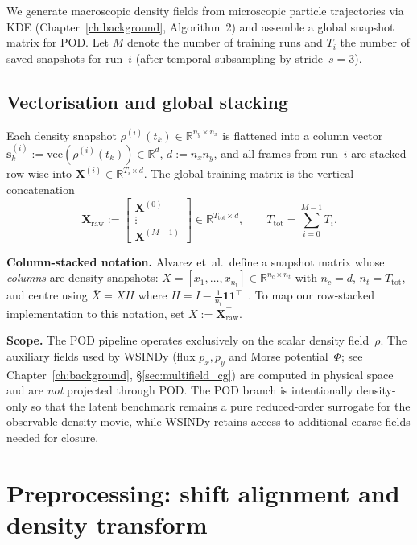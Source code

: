 We generate macroscopic density fields from microscopic particle trajectories
via KDE (Chapter~\ref{ch:background}, Algorithm~2) and assemble a global
snapshot matrix for POD.  Let $M$ denote the number of training runs and
$T_i$ the number of saved snapshots for run~$i$ (after temporal subsampling
by stride~$s=3$).

\subsection{Vectorisation and global stacking}
\label{subsec:vectorization}

Each density snapshot $\rho^{(i)}(t_k)\in\mathbb{R}^{n_y\times n_x}$ is
flattened into a column vector
$\mathbf{s}^{(i)}_k := \mathrm{vec}(\rho^{(i)}(t_k))\in\mathbb{R}^{d}$,
$d:=n_x n_y$, and all frames from run~$i$ are stacked row-wise into
$\mathbf{X}^{(i)}\in\mathbb{R}^{T_i\times d}$.  The global training matrix
is the vertical concatenation
\[
  \mathbf{X}_{\mathrm{raw}}
  :=\begin{bmatrix}
      \mathbf{X}^{(0)}\\\vdots\\\mathbf{X}^{(M-1)}
    \end{bmatrix}
  \in\mathbb{R}^{T_{\mathrm{tot}}\times d},\qquad
  T_{\mathrm{tot}}=\sum_{i=0}^{M-1}T_i.
\]

\noindent\textbf{Column-stacked notation.}
\label{subsec:column_notation}
Alvarez et~al.\ define a snapshot matrix whose \emph{columns} are density
snapshots: $X=[x_1,\dots,x_{n_t}]\in\mathbb{R}^{n_c\times n_t}$ with
$n_c{=}d$, $n_t{=}T_{\mathrm{tot}}$, and centre using $\bar{X}=XH$ where
$H=I-\tfrac{1}{n_t}\mathbf{1}\mathbf{1}^\top$~\cite{alvarez2025eqfree}.
To map our row-stacked implementation to this notation, set
$X:=\mathbf{X}_{\mathrm{raw}}^\top$.

\noindent\textbf{Scope.}
The POD pipeline operates exclusively on the scalar density field~$\rho$.
The auxiliary fields used by WSINDy (flux $p_x,p_y$ and Morse potential~$\Phi$;
see Chapter~\ref{ch:background}, \S\ref{sec:multifield_cg}) are computed
in physical space and are \emph{not} projected through POD.
The POD branch is intentionally density-only so that the latent benchmark
remains a pure reduced-order surrogate for the observable density movie,
while WSINDy retains access to additional coarse fields needed for closure.

\section{Preprocessing: shift alignment and density transform}
\label{sec:preprocessing}

